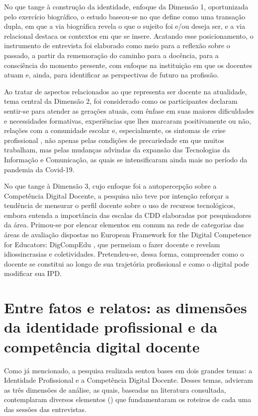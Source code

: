 \documentclass[portuguese]{textolivre}
\begin{document}
No que tange à construção da identidade, enfoque da Dimensão 1, oportunizada pelo exercício biográfico, o estudo baseou-se no que \textcite{dubar2005} define como uma transação dupla, em que a via biográfica revela o que o sujeito foi e/ou deseja ser, e a via relacional destaca os contextos em que se insere. Acatando esse posicionamento, o instrumento de entrevista foi elaborado como meio para a reflexão sobre o passado, a partir da rememoração do caminho para a docência, para a consciência do momento presente, com enfoque na instituição em que os docentes atuam e, ainda, para identificar as perspectivas de futuro na profissão.

Ao tratar de aspectos relacionados ao que representa ser docente na atualidade, tema central da Dimensão 2, foi considerado como os participantes declaram sentir-se para atender as gerações atuais, com ênfase em suas maiores dificuldades e necessidades formativas, experiências que lhes marcaram positivamente ou não, relações com a comunidade escolar e, especialmente, os sintomas de crise profissional \cite{bolivar2006}, não apenas pelas condições de precariedade em que muitos trabalham, mas pelas mudanças advindas da expansão das Tecnologias da Informação e Comunicação, as quais se intensificaram ainda mais no período da pandemia da Covid-19.

No que tange à Dimensão 3, cujo enfoque foi a autopercepção sobre a Competência Digital Docente, a pesquisa não teve por intenção reforçar a tendência de mensurar o perfil docente sobre o uso de recursos tecnológicos, embora entenda a importância das escalas da CDD elaboradas por pesquisadores da área. Primou-se por elencar elementos em comum na rede de categorias das áreas de avaliação dispostas no European Framework for the Digital Competence for Educators: DigCompEdu \cite{redecker2017}, que permeiam o fazer docente e revelam idiossincrasias e coletividades. Pretendeu-se, dessa forma, compreender como o docente se constitui ao longo de sua trajetória profissional e como o digital pode modificar sua IPD. 

\section{Entre fatos e relatos: as dimensões da identidade profissional e da competência digital docente}\label{sec-fmt-manuscrito}
Como já mencionado, a pesquisa realizada sentou bases em dois grandes temas: a Identidade Profissional e a Competência Digital Docente. Desses temas, advieram as três dimensões de análise, as quais, baseadas na literatura consultada, contemplaram diversos elementos () que fundamentaram os roteiros de cada uma das sessões das entrevistas.
\end{document}
